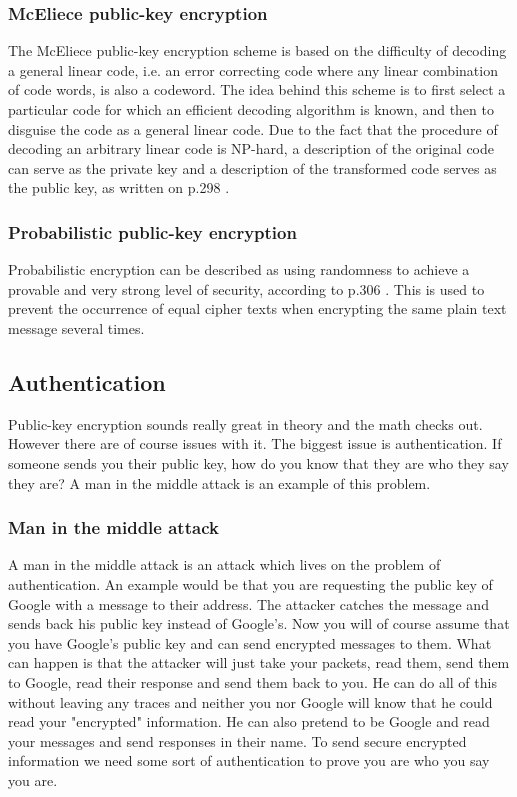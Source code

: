 \documentclass{acm_proc_article-sp}
\begin{document}
\subsubsection{McEliece public-key encryption}
The McEliece public-key encryption scheme is based on the
difficulty of decoding a general linear code, i.e. an error correcting code where any linear combination of code words, is also a codeword. \cite{code} The idea behind this scheme is to first select a particular code for which an efficient decoding algorithm is known, and then to disguise the code as a general linear code. Due to the fact that the procedure of decoding an arbitrary linear code is NP-hard, a description of the original code can serve as the private key and a description of the transformed code serves as the public key, as written on p.298 \cite{handcrypt}.

\subsubsection{Probabilistic public-key encryption}
Probabilistic encryption can be described as using randomness to achieve a provable and very strong level of security, according to p.306 \cite{handcrypt}. This is used to prevent the occurrence of equal cipher texts when encrypting the same plain text message several times.

\subsection{Authentication}
Public-key encryption sounds really great in theory and the math checks out. However there are of course issues with it. The biggest issue is authentication. If someone sends you their public key, how do you know that they are who they say they are? A man in the middle attack is an example of this problem.

\subsubsection{Man in the middle attack}
A man in the middle attack is an attack which lives on the problem of authentication.  An example would be that you are requesting the public key of Google with a message to their address. The attacker catches the message and sends back his public key instead of Google's. Now you will of course assume that you have Google's public key and can send encrypted messages to them. What can happen is that the attacker will just take your packets, read them, send them to Google, read their response and send them back to you. He can do all of this without leaving any traces and neither you nor Google will know that he could read your "encrypted" information. He can also pretend to be Google and read your messages and send responses in their name. To send secure encrypted information we need some sort of authentication to prove you are who you say you are.
\end{document}
